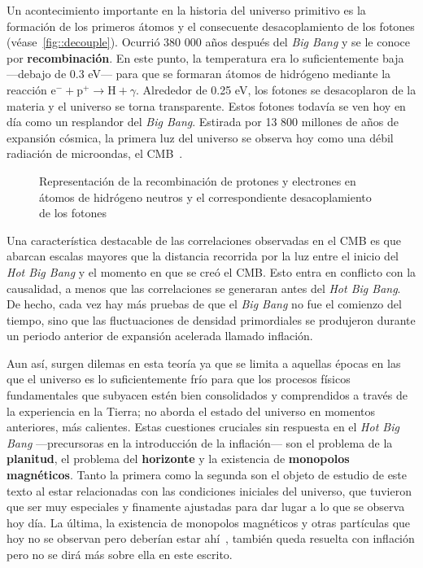 Un acontecimiento importante en la historia del universo primitivo es la formación de los primeros átomos y el consecuente desacoplamiento de los fotones (véase~\autoref{fig::decouple}). Ocurrió 380 000 años después del \textit{Big Bang} y se le conoce por \textbf{recombinación}. En este punto, la temperatura era lo suficientemente baja ---debajo de 0.3 eV--- para que se formaran átomos de hidrógeno mediante la reacción \(\mathrm{e^{-}}+\mathrm{p^+}\rightarrow \mathrm{H}+\gamma\). Alrededor de 0.25 eV, los fotones se desacoplaron de la materia y el universo se torna transparente. Estos fotones todavía se ven hoy en día como un resplandor del \textit{Big Bang}. Estirada por 13 800 millones de años de expansión cósmica, la primera luz del universo se observa hoy como una débil radiación de microondas, el CMB~\cite{penzias1965measurement}.
\begin{figure}
    \centering
    \def\svgwidth{0.9\textwidth}
    
    \caption[Representación de la recombinación de protones y electrones]{Representación de la recombinación de protones y electrones en átomos de hidrógeno neutros y el correspondiente desacoplamiento de los fotones}
    \label{fig::decouple}
\end{figure}

Una característica destacable de las correlaciones observadas en el CMB es que abarcan escalas mayores que la distancia recorrida por la luz entre el inicio del \textit{Hot Big Bang} y el momento en que se creó el CMB. Esto entra en conflicto con la causalidad, a menos que las correlaciones se generaran antes del \textit{Hot Big Bang}. De hecho, cada vez hay más pruebas de que el \textit{Big Bang} no fue el comienzo del tiempo, sino que las fluctuaciones de densidad primordiales se produjeron durante un periodo anterior de expansión acelerada llamado inflación.

Aun así, surgen dilemas en esta teoría ya que se limita a aquellas épocas en las que el universo es lo suficientemente frío para que los procesos físicos fundamentales que subyacen estén bien consolidados y comprendidos a través de la experiencia en la Tierra; no aborda el estado del universo en momentos anteriores, más calientes. Estas cuestiones cruciales sin respuesta en el \textit{Hot Big Bang} ---precursoras en la introducción de la inflación--- son el problema de la \textbf{planitud}, el problema del \textbf{horizonte} y la existencia de \textbf{monopolos magnéticos}. Tanto la primera como la segunda son el objeto de estudio de este texto al estar relacionadas con las condiciones iniciales del universo, que tuvieron que ser muy especiales y finamente ajustadas para dar lugar a lo que se observa hoy día. La última, la existencia de monopolos magnéticos y otras partículas que hoy no se observan pero deberían estar ahí~\cite{liddle1998introduction}, también queda resuelta con inflación pero no se dirá más sobre ella en este escrito.

